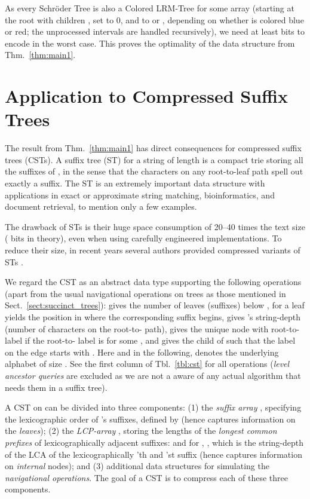 \documentclass[11pt,onecolumn,final]{article} \usepackage{a4}
\theoremstyle{plain}
\theoremstyle{remark}
\begin{document}
As every Schr\"oder Tree is also a Colored LRM-Tree for some array  (starting at the root with children , set  to 0, and  to  or , depending on whether  is colored blue or red; the unprocessed intervals are handled recursively), we need at least  bits to encode  in the worst case. This proves the optimality of the data structure from Thm.~\ref{thm:main1}.

\section{Application to Compressed Suffix Trees}
\label{sect:cst}
The result from Thm.~\ref{thm:main1} has direct consequences for compressed suffix trees (CSTs). A suffix tree (ST) for a string  of length  is a compact trie storing all the suffixes of , in the sense that the characters on any root-to-leaf path spell out exactly a suffix. The ST is an extremely important data structure with applications in exact or approximate string matching, bioinformatics, and document retrieval, to mention only a few examples.

The drawback of STs is their huge space consumption of 20--40 times the text size ( bits in theory), even when using carefully engineered implementations. To reduce their size, in recent years several authors provided compressed variants of STs \cite{munro01space,grossi05compressed,sadakane07compressed,russo08fully,fischer09faster,ohlebusch09compressed,canovas10practical,ohlebusch10cst++,fischer10wee}.

We regard the CST as an abstract data type supporting the following operations (apart from the usual navigational operations on trees as those mentioned in Sect.~\ref{sect:succinct_trees}):  gives the number of leaves (suffixes) below ,  for a leaf  yields the position in  where the corresponding suffix begins,  gives 's string-depth (number of characters on the root-to- path),  gives the unique node  with root-to- label  if the root-to- label is  for some , and  gives the child  of  such that the label on the edge  starts with . Here and in the following,  denotes the underlying alphabet of size . See the first column of Tbl.~\ref{tbl:cst} for all operations (\emph{level ancestor queries} are excluded as we are not a aware of any actual algorithm that needs them in a suffix tree).

A CST on  can be divided into three components: (1) the \emph{suffix array} , specifying the lexicographic order of 's suffixes, defined by  (hence  captures information on the \emph{leaves}); (2) the \emph{LCP-array} , storing the lengths of the \emph{longest common prefixes} of lexicographically adjacent suffixes:  and for , , which is the string-depth of the LCA of the lexicographically 'th and 'st suffix (hence  captures information on \emph{internal} nodes); and (3) additional data structures for simulating the \emph{navigational operations}. The goal of a CST is to compress each of these three components.
\end{document}
